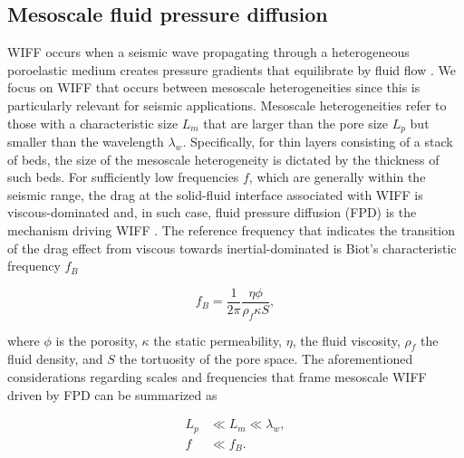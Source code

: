 \documentclass[draft]{agujournal2019}
\begin{document}
\subsection{Mesoscale fluid pressure diffusion}
WIFF occurs when a seismic wave propagating through a heterogeneous poroelastic medium creates
pressure gradients that equilibrate by fluid flow \cite{Muller2010}.
We focus on WIFF that occurs between mesoscale heterogeneities since this is particularly relevant for seismic applications. Mesoscale heterogeneities refer to those with a characteristic size $L_m$ that are larger than the pore size $L_p$ but smaller than the wavelength $\lambda_w$. Specifically, for thin layers consisting of a stack of beds, the size of the mesoscale heterogeneity is dictated by the thickness of such beds.
For sufficiently low frequencies $f$, which are generally within the seismic range, the drag at the solid-fluid interface associated with WIFF is viscous-dominated \cite{Johnson1987} and, in such case, fluid pressure diffusion (FPD) is the mechanism driving WIFF \cite{Pride2005}. The reference frequency that indicates the transition of the drag effect from viscous towards inertial-dominated is Biot's characteristic frequency $f_B$ \cite{Biot1956, Dutta1979}
\begin{linenomath*}
\begin{equation}\label{Eq.1}
f_B= \frac{1}{2 \pi} \frac{\eta \phi}{ \rho_f \kappa S },
\end{equation}
\end{linenomath*}
where $\phi$ is the porosity, $\kappa$  the static permeability, $\eta$, the fluid viscosity,  $\rho_f$ the fluid density, and $S$ the tortuosity of the pore space. The aforementioned considerations regarding scales and frequencies that frame mesoscale WIFF driven by FPD can be summarized as
\begin{linenomath*}
\begin{equation}\label{Eq.2}
\begin{split}
 L_p & \ll L_m \ll \lambda_w, \\
f & \ll f_B.
\end{split}
\end{equation}
\end{linenomath*}
\end{document}

